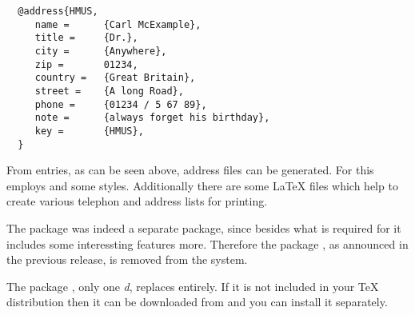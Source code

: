\begin{lstlisting}
  @address{HMUS,
     name =      {Carl McExample},
     title =     {Dr.},
     city =      {Anywhere},
     zip =       01234,
     country =   {Great Britain},
     street =    {A long Road},
     phone =     {01234 / 5 67 89},
     note =      {always forget his birthday},
     key =       {HMUS},
  }
\end{lstlisting}

From entries, as can be seen above, address files can be generated.  For this
 employs \BibTeX{} and some \BibTeX{} styles.  Additionally
there are some \LaTeX{} files which help to create various telephon and
address lists for printing.

The package  was indeed a separate package, since besides
what is required for \KOMAScript{} it includes some interessting features
more.  Therefore the package , as announced in the previous
\KOMAScript{} release, is removed from the \KOMAScript{} system.

The package , only one \emph{d}, replaces 
entirely.  If it is not included in your \TeX{} distribution then it can be
downloaded from \cite{package:adrconv} and you can install it separately.

